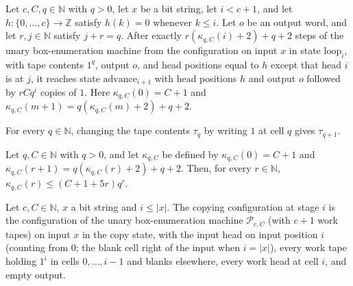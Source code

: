 \begin{lemma}
\label{Complexity.poly_loop}
\leanok
{}
Let $c,C,q\in\mathbb{N}$ with $q>0$, let $x$ be a bit string, let $i<c+1$, and let
$h:\{0,\ldots,c\}\to\mathbb{Z}$ satisfy $h(k)=0$ whenever $k\le i$. Let $o$ be an output
word, and let $r,j\in\mathbb{N}$ satisfy $j+r=q$. After exactly
$r(\kappa_{q,C}(i)+2)+q+2$ steps of the unary box-enumeration machine from the
configuration on input $x$ in state $\mathrm{loop}_i$, with tape contents $1^q$, output
$o$, and head positions equal to $h$ except that head $i$ is at $j$, it reaches state
$\mathrm{advance}_{i+1}$ with head positions $h$ and output $o$ followed by $rCq^i$
copies of $1$. Here $\kappa_{q,C}(0)=C+1$ and
$\kappa_{q,C}(m+1)=q(\kappa_{q,C}(m)+2)+q+2$.
\end{lemma}

\begin{lemma}
\label{Complexity.polyTape_write}
\leanok
{}
For every $q\in\mathbb{N}$, changing the tape contents $\tau_q$ by writing $1$ at cell
$q$ gives $\tau_{q+1}$.
\end{lemma}

\begin{lemma}
\label{Complexity.polyCost_le}
\leanok
{}
Let $q,C\in\mathbb{N}$ with $q>0$, and let $\kappa_{q,C}$ be defined by
$\kappa_{q,C}(0)=C+1$ and $\kappa_{q,C}(r+1)=q(\kappa_{q,C}(r)+2)+q+2$. Then, for every
$r\in\mathbb{N}$, $\kappa_{q,C}(r)\le (C+1+5r)q^r$.
\end{lemma}

\begin{definition}
\label{Complexity.polyCopyCfg}
\leanok
{}
Let $c, C \in \mathbb{N}$, $x$ a bit string and $i \le |x|$. The copying configuration at stage $i$ is the configuration of the unary box-enumeration machine $\mathcal{P}_{c,C}$ (with $c+1$ work tapes) on input $x$ in the copy state, with the input head on input position $i$ (counting from $0$; the blank cell right of the input when $i = |x|$), every work tape holding $1^i$ in cells $0,\dots,i-1$ and blanks elsewhere, every work head at cell $i$, and empty output.
\end{definition}

